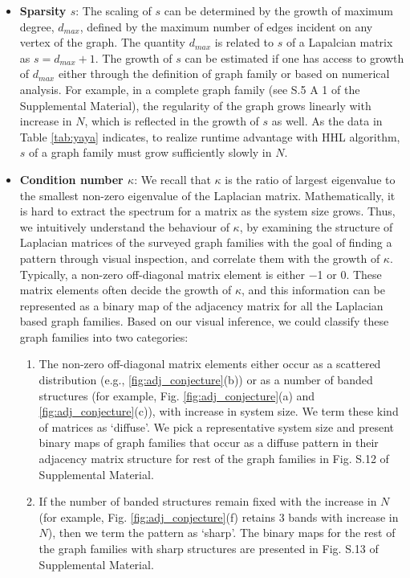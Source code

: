 \documentclass[%
 reprint,
 superscriptaddress,
 amsmath,amssymb,
 aps,
 pra,
floatfix,
nofootinbib,
]{revtex4-2}
\theoremstyle{definition}
\theoremstyle{remark}
\begin{document}
\begin{itemize} 
    \item \textbf{Sparsity $s$}: The scaling of $s$ can be determined by the growth of maximum degree, $d_{max}$, defined by the maximum number of edges incident on any vertex of the graph. The quantity $d_{max}$ is related to $s$ of a Lapalcian matrix as $s= d_{max}+ 1$. The growth of $s$ can be estimated if one has access to growth of $d_{max}$ either through the definition of graph family or based on numerical analysis. For example, in a complete graph family (see S.5 A 1 of the Supplemental Material), the regularity of the graph grows linearly with increase in $N$, which is reflected in the growth of $s$ as well. As the data in Table \ref{tab:yaya} indicates, to realize runtime advantage with HHL algorithm, $s$ of a graph family must grow sufficiently slowly in $N$. 

    \item\textbf{Condition number $\kappa$}: We recall that $\kappa$ is the ratio of largest eigenvalue to the smallest non-zero eigenvalue of the Laplacian matrix. Mathematically, it is hard to extract the spectrum for a matrix as the system size grows. Thus, we intuitively understand the behaviour of $\kappa$, by examining the structure of Laplacian matrices of the surveyed graph families with the goal of finding a pattern through visual inspection, and correlate them with the growth of $\kappa$. Typically, a non-zero off-diagonal matrix element is either $-$1 or 0. These matrix elements often decide the growth of $\kappa$, and this information can be represented as a binary map of the adjacency matrix for all the Laplacian based graph families. Based on our visual inference, we could classify these graph families into two categories:
    \begin{enumerate}
        \item The non-zero off-diagonal matrix elements either occur as a scattered distribution (e.g., \ref{fig:adj_conjecture}(b)) or as a number of banded structures (for example, Fig. \ref{fig:adj_conjecture}(a) and \ref{fig:adj_conjecture}(c)), with increase in system size. We term these kind of matrices as `diffuse'. We pick a representative system size and present binary maps of graph families that occur as a diffuse pattern in their adjacency matrix structure for rest of the graph families in Fig. S.12 of Supplemental Material. 

        \item If the number of banded structures remain fixed with the increase in $N$ (for example, Fig. \ref{fig:adj_conjecture}(f) retains 3 bands with increase in $N$), then we term the pattern as `sharp'. The binary maps for the rest of the graph families with sharp structures are presented in Fig. S.13 of Supplemental Material. 
    \end{enumerate} 
    

\end{itemize}
\end{document}
